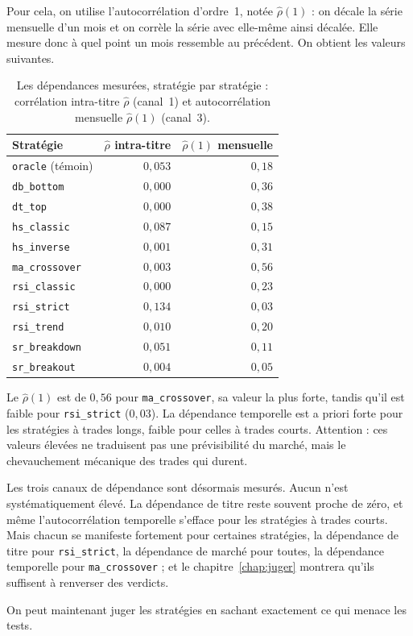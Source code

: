 Pour cela, on utilise l'autocorrélation d'ordre~1, notée
$\hat\rho(1)$ : on décale la série mensuelle d'un mois et on corrèle la série
avec elle-même ainsi décalée. Elle mesure donc à quel point un mois ressemble
au précédent. On obtient les valeurs suivantes.
\begin{table}[H]
\centering
\caption{Les dépendances mesurées, stratégie par stratégie :
corrélation intra-titre $\hat\rho$ (canal~1) et autocorrélation
mensuelle $\hat\rho(1)$ (canal~3).}
\label{tab:dep-mesures}
\small
\begin{tabular}{@{}lrr@{}}
\toprule
Stratégie & $\hat\rho$ intra-titre & $\hat\rho(1)$ mensuelle \\
\midrule
\texttt{oracle} (témoin) & $0{,}053$ & $0{,}18$ \\
\midrule
\texttt{db\_bottom}    & $0{,}000$ & $0{,}36$ \\
\texttt{dt\_top}       & $0{,}000$ & $0{,}38$ \\
\texttt{hs\_classic}   & $0{,}087$ & $0{,}15$ \\
\texttt{hs\_inverse}   & $0{,}001$ & $0{,}31$ \\
\texttt{ma\_crossover} & $0{,}003$ & $0{,}56$ \\
\texttt{rsi\_classic}  & $0{,}000$ & $0{,}23$ \\
\texttt{rsi\_strict}   & $0{,}134$ & $0{,}03$ \\
\texttt{rsi\_trend}    & $0{,}010$ & $0{,}20$ \\
\texttt{sr\_breakdown} & $0{,}051$ & $0{,}11$ \\
\texttt{sr\_breakout}  & $0{,}004$ & $0{,}05$ \\
\bottomrule
\end{tabular}
\end{table}

Le $\hat\rho(1)$ est de $0{,}56$ pour \texttt{ma\_crossover}, sa valeur la plus
forte, tandis qu'il est faible pour \texttt{rsi\_strict} ($0{,}03$).
La dépendance temporelle est a priori forte pour les stratégies
à trades longs, faible pour celles à trades courts. Attention :
ces valeurs élevées ne traduisent pas une prévisibilité du
marché, mais le chevauchement mécanique des trades qui durent.

Les trois canaux de dépendance sont désormais mesurés. Aucun n'est
systématiquement élevé. La dépendance de titre reste souvent proche de zéro,
et même l'autocorrélation temporelle s'efface pour les stratégies à trades
courts. Mais chacun se manifeste fortement pour certaines stratégies, la
dépendance de titre pour \texttt{rsi\_strict}, la dépendance de marché pour
toutes, la dépendance temporelle pour \texttt{ma\_crossover} ; et le
chapitre~\ref{chap:juger} montrera qu'ils suffisent à renverser des verdicts.

On peut maintenant juger les stratégies en sachant exactement ce qui menace
les tests.
